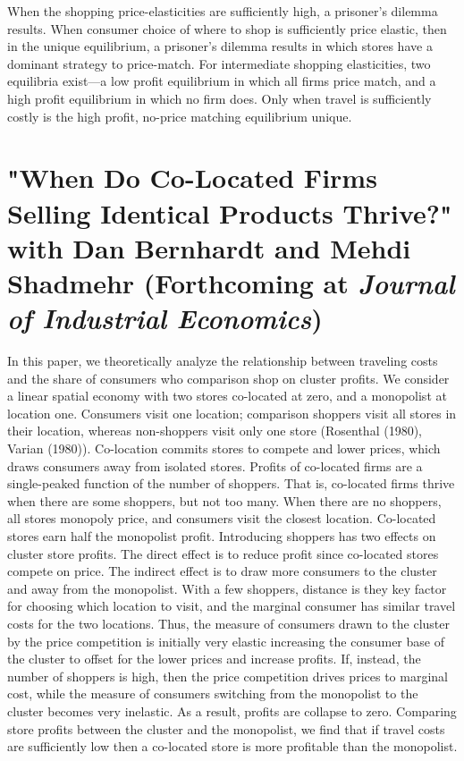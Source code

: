 \documentclass[12pt]{article}
\begin{document}
When the shopping price-elasticities are sufficiently high, a prisoner’s dilemma results.
When consumer choice of where to shop is sufficiently price elastic, then in the unique equilibrium, a prisoner’s dilemma results in which stores have a dominant strategy to price-match.
For intermediate shopping elasticities, two equilibria exist—a low profit equilibrium in which all firms price match, and a high profit equilibrium in which no firm does.
Only when travel is sufficiently costly is the high profit, no-price matching equilibrium unique.

\vspace{0.25cm}
\section{"When Do Co-Located Firms Selling Identical Products Thrive?" with Dan Bernhardt and Mehdi Shadmehr (Forthcoming at \emph{Journal of Industrial Economics})}
\label{sec:orgb5a20e1}
\vspace{0.1cm}

\noindent
In this paper, we theoretically analyze the relationship between traveling costs and the share of consumers who comparison shop on cluster profits.
We consider a linear spatial economy with two stores co-located at zero, and a monopolist at location one.
Consumers visit one location; comparison shoppers visit all stores in their location, whereas non-shoppers visit only one store (Rosenthal (1980), Varian (1980)).
Co-location commits stores to compete and lower prices, which draws consumers away from isolated stores.
Profits of co-located firms are a single-peaked function of the number of shoppers.
That is, co-located firms thrive when there are some shoppers, but not too many.
When there are no shoppers, all stores monopoly price, and consumers visit the closest location.
Co-located stores earn half the monopolist profit.
Introducing shoppers has two effects on cluster store profits.
The direct effect is to reduce profit since co-located stores compete on price.
The indirect effect is to draw more consumers to the cluster and away from the monopolist.
With a few shoppers, distance is they key factor for choosing which location to visit, and the marginal consumer has similar travel costs for the two locations.
Thus, the measure of consumers drawn to the cluster by the price competition is initially very elastic increasing the consumer base of the cluster to offset for the lower prices and increase profits.
If, instead, the number of shoppers is high, then the price competition drives prices to marginal cost, while the measure of consumers switching from the monopolist to the cluster becomes very inelastic.
As a result, profits are collapse to zero.
Comparing store profits between the cluster and the monopolist, we find that if travel costs are sufficiently low then a co-located store is more profitable than the monopolist.
\end{document}

